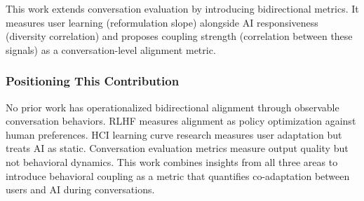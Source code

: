 This work extends conversation evaluation by introducing bidirectional metrics. It measures user learning (reformulation slope) alongside AI responsiveness (diversity correlation) and proposes coupling strength (correlation between these signals) as a conversation-level alignment metric.

\subsubsection{Positioning This Contribution}

No prior work has operationalized bidirectional alignment through observable conversation behaviors. RLHF measures alignment as policy optimization against human preferences. HCI learning curve research measures user adaptation but treats AI as static. Conversation evaluation metrics measure output quality but not behavioral dynamics. This work combines insights from all three areas to introduce behavioral coupling as a metric that quantifies co-adaptation between users and AI during conversations.
